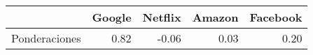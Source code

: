 \begin{table}[ht]
\centering
\begin{tabular}{rrrrr}
  \hline
 & Google & Netflix & Amazon & Facebook \\ 
  \hline
Ponderaciones & 0.82 & -0.06 & 0.03 & 0.20 \\ 
   \hline
\end{tabular}
\end{table}
